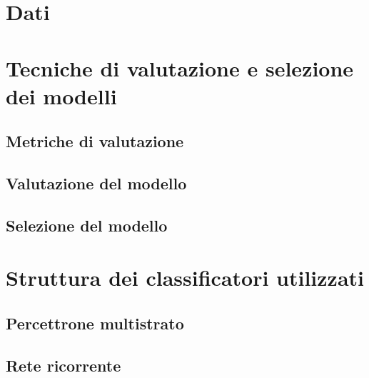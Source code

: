 \documentclass[4apaper,11pt]{report}
\begin{document}
\section{Dati}
\label{sec:dataset}


\section{Tecniche di valutazione e selezione dei modelli}
\label{sec:metrichevalutazione}

\subsection{Metriche di valutazione}

\subsection{Valutazione del modello} %

\subsection{Selezione del modello} %


\section{Struttura dei classificatori utilizzati}

\subsection{Percettrone multistrato}
\label{sec:strutturaPercettrone}

\subsection{Rete ricorrente}
\label{sec:strutturaRNN}



\end{document}

